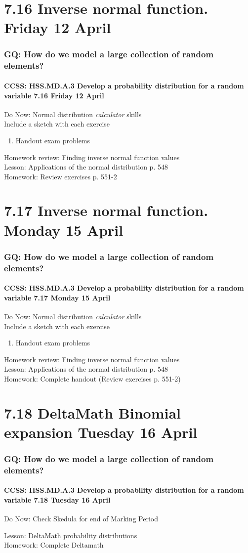 \documentclass{beamer}
\begin{document}
\section{7.16 Inverse normal function. Friday 12 April}
  \frame
  {
    \frametitle{GQ: How do we model a large collection of random elements?}
    \framesubtitle{CCSS: HSS.MD.A.3 Develop a probability distribution for a random variable \hfill \alert{7.16 Friday 12 April}}

    \begin{block}{Do Now: Normal distribution \emph{calculator} skills\\Include a sketch with each exercise}
    \begin{enumerate}
      \item Handout exam problems
    \end{enumerate}
    \end{block}
    Homework review: Finding inverse normal function values\\
    Lesson: Applications of the normal distribution p. 548\\
    Homework: Review exercises p. 551-2
  }

\section{7.17 Inverse normal function. Monday 15 April}
  \frame
  {
    \frametitle{GQ: How do we model a large collection of random elements?}
    \framesubtitle{CCSS: HSS.MD.A.3 Develop a probability distribution for a random variable \hfill \alert{7.17 Monday 15 April}}

    \begin{block}{Do Now: Normal distribution \emph{calculator} skills\\Include a sketch with each exercise}
    \begin{enumerate}
      \item Handout exam problems
    \end{enumerate}
    \end{block}
    Homework review: Finding inverse normal function values\\
    Lesson: Applications of the normal distribution p. 548\\
    Homework: Complete handout (Review exercises p. 551-2)
  }


  \section{7.18 DeltaMath Binomial expansion Tuesday 16 April}
    \frame
    {
      \frametitle{GQ: How do we model a large collection of random elements?}
      \framesubtitle{CCSS: HSS.MD.A.3 Develop a probability distribution for a random variable \hfill \alert{7.18 Tuesday 16 April}}

      \begin{block}{Do Now: Check Skedula for end of Marking Period}
      \end{block}
      Lesson: DeltaMath probability distributions\\[1cm]
      Homework: Complete Deltamath
    }
\end{document}
